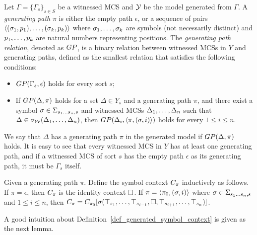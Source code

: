 \documentclass{amsart}
\begin{document}
\begin{definition}
\label{def_generating_path}
Let $\Gamma = \{ \Gamma_s \}_{s \in S}$ be a witnessed MCS and
$\mathcal{Y}$ be the model generated from $\Gamma$.
A \emph{generating path} $\pi$ is either the empty path $\epsilon$, or
a sequence of pairs 
$\langle (\sigma_1, p_1) ,\dots, (\sigma_k , p_k) \rangle$
where $\sigma_1 ,\dots, \sigma_k$ are symbols (not necessarily distinct)
and $p_1 ,\dots, p_k$ are natural numbers representing positions.
The \emph{generating path relation}, denoted as $GP$,
is a binary relation
between witnessed MCSs in $Y$
and generating paths,
defined as the smallest relation that satisfies the following conditions:
\begin{itemize}
\item $GP(\Gamma_s, \epsilon)$ holds for every sort $s$;
\item If $GP(\Delta,\pi)$ holds for a set $\Delta \in Y_s$ and a generating path $\pi$,
      and there exist a symbol $\sigma \in \Sigma_{s_1 \dots s_n, s}$ and 
      witnessed MCSs $\Delta_1 ,\dots, \Delta_n$ such that
      $\Delta \in \sigma_{\mathcal{W}}(\Delta_1,\dots,\Delta_n)$,
      then $GP(\Delta_i, \langle \pi, (\sigma,i) \rangle )$ holds
      for every $1 \le i \le n$.
\end{itemize}
We say that $\Delta$ has a generating path $\pi$ in the generated model if
$GP(\Delta,\pi)$ holds.
It is easy to see that every witnessed MCS in $Y$
has at least one generating path,
and if a witnessed MCS of sort $s$
has the empty path $\epsilon$ as its generating path,
it must be $\Gamma_s$ itself.
\end{definition}

\begin{definition}
\label{def_generated_symbol_context}
Given a generating path $\pi$.
Define the symbol context ${C_\pi}$
inductively as follows.
If $\pi = \epsilon$, 
then ${C_\pi}$ is the identity context $\square$.
If $\pi = \langle \pi_0 , (\sigma, i) \rangle$
where  $\sigma \in \Sigma_{s_1 \dots s_n , s}$
and $1 \le i \le n$,
then
${C_\pi} = C_{\pi_0}[
\sigma(\top_{s_1} ,\dots, \top_{s_{i-1}} , \square , 
\top_{s_{i+1}} ,\dots, \top_{s_n})
]$.
\end{definition}

A good intuition about Definition~\ref{def_generated_symbol_context}
is given as the next lemma.
\end{document}
